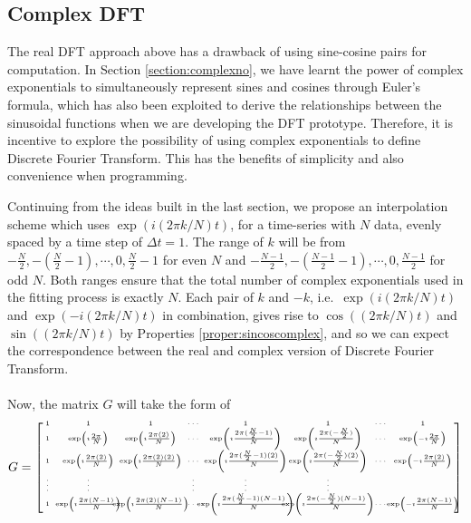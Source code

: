 \subsection{Complex DFT}

The real DFT approach above has a drawback of using sine-cosine pairs for computation. In Section \ref{section:complexno}, we have learnt the power of complex exponentials to simultaneously represent sines and cosines through Euler's formula, which has also been exploited to derive the relationships between the sinusoidal functions when we are developing the DFT prototype. Therefore, it is incentive to explore the possibility of using complex exponentials to define Discrete Fourier Transform. This has the benefits of simplicity and also convenience when programming.

Continuing from the ideas built in the last section, we propose an interpolation scheme which uses $\exp(i (2\pi k/N) t)$, for a time-series with $N$ data, evenly spaced by a time step of $\Delta t = 1$. The range of $k$ will be from $-\frac{N}{2}, -(\frac{N}{2}-1), \cdots, 0, \frac{N}{2}-1$ for even $N$ and $-\frac{N-1}{2}, -(\frac{N-1}{2}-1), \cdots, 0, \frac{N-1}{2}$ for odd $N$. Both ranges ensure that the total number of complex exponentials used in the fitting process is exactly $N$. Each pair of $k$ and $-k$, i.e.\ $\exp(i (2\pi k/N) t)$ and $\exp(-i (2\pi k/N) t)$ in combination, gives rise to $\cos((2\pi k/N) t)$ and $\sin((2\pi k/N) t)$ by Properties \ref{proper:sincoscomplex}, and so we can expect the correspondence between the real and complex version of Discrete Fourier Transform.\\
\\
Now, the matrix $G$ will take the form of
\begin{align*}
G = \tiny
\left[\begin{array}{@{\,}wc{5pt}wc{40pt}wc{40pt}wc{8pt}wc{56pt}wc{56pt}wc{8pt}wc{40pt}}
1 & 1 & 1 & \cdots & 1 & 1 & \cdots & 1\\
1 & \exp(\imath\frac{2\pi}{N}) & \exp(\imath\frac{2\pi(2)}{N}) & \cdots & \exp(\imath\frac{2\pi(\frac{N}{2}-1)}{N}) & \exp(\imath\frac{2\pi(-\frac{N}{2})}{N}) & \cdots & \exp(-\imath\frac{2\pi}{N}) \\
1 & \exp(\imath\frac{2\pi(2)}{N}) & \exp(\imath\frac{2\pi(2)(2)}{N}) & \cdots & \exp(\imath\frac{2\pi(\frac{N}{2}-1)(2)}{N}) & \exp(\imath\frac{2\pi(-\frac{N}{2})(2)}{N}) & \cdots & \exp(-\imath\frac{2\pi(2)}{N})\\
\vdots & \vdots & & \vdots & \vdots & \vdots &  & \\
1 & \exp(\imath\frac{2\pi(N-1)}{N}) & \exp(\imath\frac{2\pi(2)(N-1)}{N}) & \cdots & \exp(\imath\frac{2\pi(\frac{N}{2}-1)(N-1)}{N}) & \exp(\imath\frac{2\pi(-\frac{N}{2})(N-1)}{N}) & \cdots & \exp(-\imath\frac{2\pi(N-1)}{N}) \\
\end{array}\right]
\end{align*}
